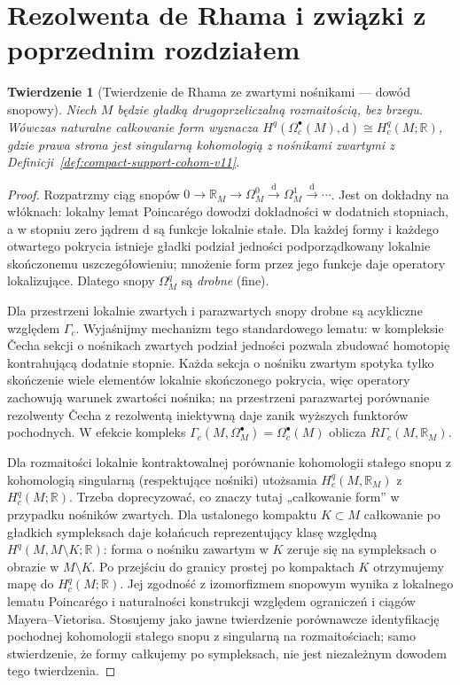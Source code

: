\documentclass[11pt,a4paper,oneside]{report}
\newcommand{\R}{\mathbb{R}}
\newcommand{\dd}{\mathrm d}
\theoremstyle{plain}
\newtheorem{twierdzenie}{Twierdzenie}[section]
\theoremstyle{definition}
\theoremstyle{remark}
\begin{document}
\section{Rezolwenta de Rhama i związki z poprzednim rozdziałem}
\begin{twierdzenie}[Twierdzenie de Rhama ze zwartymi nośnikami — dowód snopowy]
\label{thm:de-rham-sheaf-v12}
Niech $M$ będzie gładką drugoprzeliczalną rozmaitością,
bez brzegu. Wówczas naturalne całkowanie form wyznacza
$H^q(\Omega_c^\bullet(M),\dd)\cong H_c^q(M;\R)$,
gdzie prawa strona jest singularną kohomologią z nośnikami
zwartymi z Definicji~\ref{def:compact-support-cohom-v11}.
\end{twierdzenie}
\begin{proof}
Rozpatrzmy ciąg snopów
$0\to\R_M\to\Omega_M^0\xrightarrow{\dd}\Omega_M^1
\xrightarrow{\dd}\cdots$. Jest on dokładny na włóknach:
lokalny lemat Poincarégo dowodzi dokładności w dodatnich
stopniach, a w stopniu zero jądrem $\dd$ są funkcje lokalnie
stałe. Dla każdej formy i każdego otwartego pokrycia
istnieje gładki podział jedności podporządkowany
lokalnie skończonemu uszczegółowieniu; mnożenie form
przez jego funkcje daje operatory lokalizujące.
Dlatego snopy $\Omega_M^q$ są \emph{drobne} (fine).

Dla przestrzeni lokalnie zwartych i parazwartych snopy
drobne są acykliczne względem $\Gamma_c$. Wyjaśnijmy
mechanizm tego standardowego lematu: w kompleksie
\v{C}echa sekcji o nośnikach zwartych podział jedności
pozwala zbudować homotopię kontrahującą dodatnie
stopnie. Każda sekcja o nośniku zwartym spotyka tylko
skończenie wiele elementów lokalnie skończonego pokrycia,
więc operatory zachowują warunek zwartości nośnika;
na przestrzeni parazwartej porównanie rezolwenty
\v{C}echa z rezolwentą iniektywną daje zanik wyższych
funktorów pochodnych. W efekcie kompleks
$\Gamma_c(M,\Omega_M^\bullet)=\Omega_c^\bullet(M)$
oblicza $R\Gamma_c(M,\R_M)$.

Dla rozmaitości lokalnie kontraktowalnej porównanie
kohomologii stałego snopu z kohomologią singularną
(respektujące nośniki) utożsamia
$H_c^q(M,\R_M)$ z $H_c^q(M;\R)$.
Trzeba doprecyzować, co znaczy tutaj „całkowanie form”
w przypadku nośników zwartych. Dla ustalonego kompaktu
$K\subset M$ całkowanie po gładkich sympleksach daje
kołańcuch reprezentujący klasę względną
$H^q(M,M\setminus K;\R)$: forma o nośniku zawartym
w $K$ zeruje się na sympleksach o obrazie w $M\setminus K$.
Po przejściu do granicy prostej po kompaktach $K$
otrzymujemy mapę do $H_c^q(M;\R)$.
Jej zgodność z izomorfizmem snopowym wynika z lokalnego
lematu Poincarégo i naturalności konstrukcji względem
ograniczeń i ciągów Mayera--Vietorisa.
Stosujemy jako jawne twierdzenie porównawcze
identyfikację pochodnej kohomologii stałego snopu
z singularną na rozmaitościach; samo stwierdzenie,
że formy całkujemy po sympleksach, nie jest niezależnym
dowodem tego twierdzenia.
\end{proof}
\end{document}
